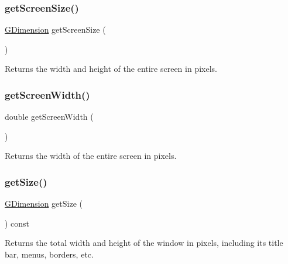 \subsubsection{\texorpdfstring{get\+Screen\+Size()}{getScreenSize()}}
{\footnotesize\ttfamily \mbox{\hyperlink{classGDimension}{G\+Dimension}} get\+Screen\+Size (\begin{DoxyParamCaption}{ }\end{DoxyParamCaption})\hspace{0.3cm}{\ttfamily [static]}}



Returns the width and height of the entire screen in pixels. 

\mbox{\label{classGWindow_adc82933bd579ab83d7cd4e3bc5f79a12}} 
\subsubsection{\texorpdfstring{get\+Screen\+Width()}{getScreenWidth()}}
{\footnotesize\ttfamily double get\+Screen\+Width (\begin{DoxyParamCaption}{ }\end{DoxyParamCaption})\hspace{0.3cm}{\ttfamily [static]}}



Returns the width of the entire screen in pixels. 

\mbox{\label{classGWindow_a7b4eec96a2bdc6420695d5796a78eea9}} 
\subsubsection{\texorpdfstring{get\+Size()}{getSize()}}
{\footnotesize\ttfamily \mbox{\hyperlink{classGDimension}{G\+Dimension}} get\+Size (\begin{DoxyParamCaption}{ }\end{DoxyParamCaption}) const\hspace{0.3cm}{\ttfamily [virtual]}}



Returns the total width and height of the window in pixels, including its title bar, menus, borders, etc. 

